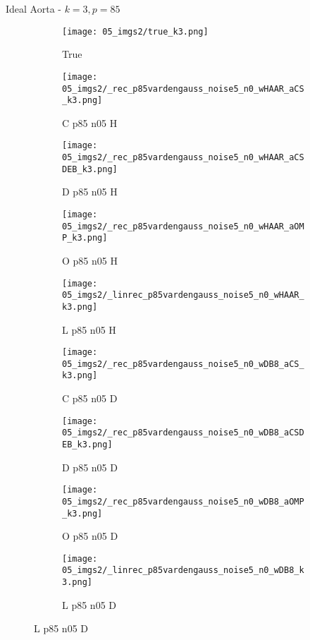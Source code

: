 \begin{frame}{Ideal Aorta - $k=3,p=85$}{}
\begin{figure}

\begin{subfigure}{0.1\textwidth}
\texttt{[image: 05\_imgs2/true\_k3.png]}
\caption*{\Tiny True}
\end{subfigure}
\begin{subfigure}{0.1\textwidth}
\texttt{[image: 05\_imgs2/\_rec\_p85vardengauss\_noise5\_n0\_wHAAR\_aCS\_k3.png]}
\caption*{\Tiny C p85 n05 H}
\end{subfigure}
\begin{subfigure}{0.1\textwidth}
\texttt{[image: 05\_imgs2/\_rec\_p85vardengauss\_noise5\_n0\_wHAAR\_aCSDEB\_k3.png]}
\caption*{\Tiny D p85 n05 H}
\end{subfigure}
\begin{subfigure}{0.1\textwidth}
\texttt{[image: 05\_imgs2/\_rec\_p85vardengauss\_noise5\_n0\_wHAAR\_aOMP\_k3.png]}
\caption*{\Tiny O p85 n05 H}
\end{subfigure}
\begin{subfigure}{0.1\textwidth}
\texttt{[image: 05\_imgs2/\_linrec\_p85vardengauss\_noise5\_n0\_wHAAR\_k3.png]}
\caption*{\Tiny L p85 n05 H}
\end{subfigure}
\begin{subfigure}{0.1\textwidth}
\texttt{[image: 05\_imgs2/\_rec\_p85vardengauss\_noise5\_n0\_wDB8\_aCS\_k3.png]}
\caption*{\Tiny C p85 n05 D}
\end{subfigure}
\begin{subfigure}{0.1\textwidth}
\texttt{[image: 05\_imgs2/\_rec\_p85vardengauss\_noise5\_n0\_wDB8\_aCSDEB\_k3.png]}
\caption*{\Tiny D p85 n05 D}
\end{subfigure}
\begin{subfigure}{0.1\textwidth}
\texttt{[image: 05\_imgs2/\_rec\_p85vardengauss\_noise5\_n0\_wDB8\_aOMP\_k3.png]}
\caption*{\Tiny O p85 n05 D}
\end{subfigure}
\begin{subfigure}{0.1\textwidth}
\texttt{[image: 05\_imgs2/\_linrec\_p85vardengauss\_noise5\_n0\_wDB8\_k3.png]}
\caption*{\Tiny L p85 n05 D}
\end{subfigure}

\vspace{5pt}


\end{figure}
\end{frame}

